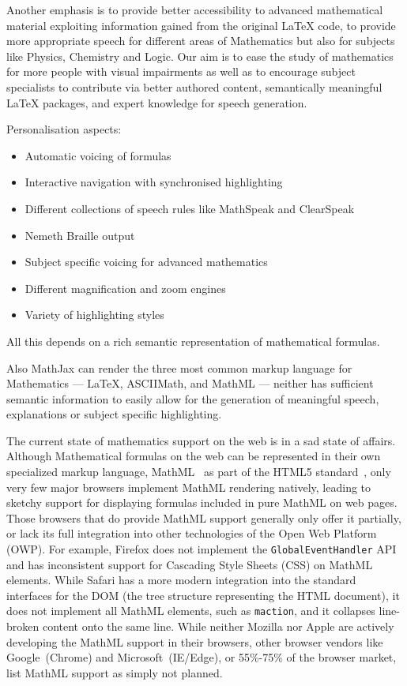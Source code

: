 \documentclass{sig-alternate}
\begin{document}
Another emphasis is to provide better accessibility to advanced mathematical
material exploiting information gained from the original LaTeX code, to provide
more appropriate speech for different areas of Mathematics but also for subjects
like Physics, Chemistry and Logic.  Our aim is to ease the study of mathematics
for more people with visual impairments as well as to encourage subject
specialists to contribute via better authored content, semantically meaningful
LaTeX packages, and expert knowledge for speech generation.


Personalisation aspects:


\begin{itemize}
\item Automatic voicing of formulas
\item Interactive navigation with synchronised highlighting
\item Different collections of speech rules like MathSpeak and ClearSpeak
\item Nemeth Braille output
\item Subject specific voicing for advanced mathematics
\item Different magnification and zoom engines
\item Variety of highlighting styles
\end{itemize}

All this depends on a rich semantic representation of mathematical formulas.


Also MathJax can render the three most common markup language for Mathematics
--- {\LaTeX}, ASCIIMath, and MathML --- neither has sufficient semantic
information to easily allow for the generation of meaningful speech,
explanations or subject specific highlighting.




The current state of mathematics support on the web is in a sad state of
affairs.  Although Mathematical formulas on the web can be represented in their
own specialized markup language, MathML~\cite{MathML3} as part of the HTML5
standard~\cite{HTML5}, only very few major browsers implement MathML rendering
natively, leading to sketchy support for displaying formulas included in pure
MathML on web pages.  Those browsers that do provide MathML support generally
only offer it partially, or lack its full integration into other technologies of
the Open Web Platform (OWP). For example, Firefox does not implement the
\texttt{GlobalEventHandler} API and has inconsistent support for Cascading Style
Sheets (CSS) on MathML elements. While Safari has a more modern integration into
the standard interfaces for the DOM (the tree structure representing the HTML
document), it does not implement all MathML elements, such as \texttt{maction},
and it collapses line-broken content onto the same line.  While neither Mozilla
nor Apple are actively developing the MathML support in their browsers, other
browser vendors like Google~(Chrome) and Microsoft~(IE/Edge), or 55\%-75\% of
the browser market, list MathML support as simply not planned.
\end{document}
